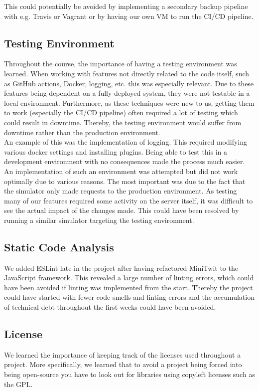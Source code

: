 This could potentially be avoided by implementing a secondary backup pipeline with e.g. Travis or Vagrant or by having our own VM to run the CI/CD pipeline.

\subsection{Testing Environment}
Throughout the course, the importance of having a testing environment was learned.
When working with features not directly related to the code itself, such as GitHub actions, Docker, logging, etc. this was especially relevant.
Due to these features being dependent on a fully deployed system, they were not testable in a local environment.  
Furthermore, as these techniques were new to us, getting them to work (especially the CI/CD pipeline) often required a lot of testing which could result in downtime. Thereby, the testing environment would suffer from downtime rather than the production environment.
\\
An example of this was the implementation of logging. This required modifying various docker settings and installing plugins. Being able to test this in a development environment with no consequences made the process much easier.
An implementation of such an environment was attempted but did not work optimally due to various reasons. The most important was due to the fact that the simulator only made requests to the production environment. As testing many of our features required some activity on the server itself, it was difficult to see the actual impact of the changes made. This could have been resolved by running a similar simulator targeting the testing environment.

\subsection{Static Code Analysis}
We added ESLint late in the project after having refactored MiniTwit to the JavaScript framework. This revealed a large number of linting errors, which could have been avoided if linting was implemented from the start. Thereby the project could have started with fewer code smells and linting errors and the accumulation of technical debt throughout the first weeks could have been avoided.


\subsection{License}
We learned the importance of keeping track of the licenses used throughout a project. More specifically, we learned that to avoid a project being forced into being open-source you have to look out for libraries using copyleft licenses such as the GPL. 